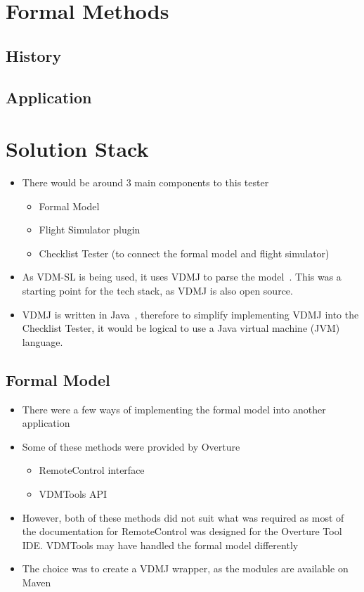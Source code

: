\documentclass[../dissertation.tex]{subfiles}
\begin{document}
\section{Formal Methods}

\subsection{History}


\subsection{Application}


\section{Solution Stack}
\begin{itemize}
  \item There would be around 3 main components to this tester
    \begin{itemize}
      \item Formal Model
      \item Flight Simulator plugin
      \item Checklist Tester (to connect the formal model and flight simulator)
    \end{itemize}
  \item As VDM-SL is being used, it uses VDMJ to parse the model~\cite{vdmj}. This was a starting
    point for the tech stack, as VDMJ is also open source.
  \item VDMJ is written in Java~\cite{vdmj}, therefore to simplify implementing VDMJ into the
    Checklist Tester, it would be logical to use a Java virtual machine (JVM) language.
\end{itemize}

\subsection{Formal Model}
\begin{itemize}
  \item There were a few ways of implementing the formal model into another application
  \item Some of these methods were provided by Overture~\cite{overture-remote}
    \begin{itemize}
      \item RemoteControl interface
      \item VDMTools API~\cite{vdmtoolbox-api}
    \end{itemize}
  \item However, both of these methods did not suit what was required as most of the
    documentation for RemoteControl was designed for the Overture Tool IDE. VDMTools
    may have handled the formal model differently
  \item The choice was to create a VDMJ wrapper, as the modules are available on Maven
\end{itemize}
\end{document}
